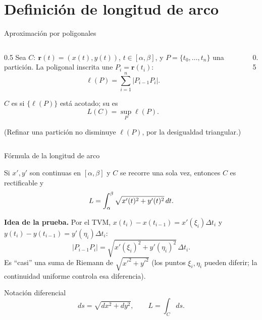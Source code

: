 \documentclass[10pt,aspectratio=169]{beamer}
\begin{document}
\section{Definición de longitud de arco}

\begin{frame}{Aproximación por poligonales}
  \begin{columns}
    \begin{column}{0.5\textwidth}
      Sea $C:\ \mathbf r(t)=(x(t),y(t))$, $t\in[\alpha,\beta]$, y $P=\{t_0,\dots,t_n\}$ una partición. La poligonal
      inscrita une $P_i=\mathbf r(t_i)$:
      \[ \ell(P)=\sum_{i=1}^n|P_{i-1}P_i|. \]
      \begin{definicion}
        $C$ es  si $\{\ell(P)\}$ está acotado; su  es
        \[ L(C)=\sup_P\ell(P). \]
      \end{definicion}
      \small (Refinar una partición no disminuye $\ell(P)$, por la desigualdad triangular.)
    \end{column}
    \begin{column}{0.5\textwidth}
      \centering
    \end{column}
  \end{columns}
\end{frame}

\begin{frame}{Fórmula de la longitud de arco}
  \begin{teorema}
    Si $x',y'$ son continuas en $[\alpha,\beta]$ y $C$ se recorre una sola vez, entonces $C$ es rectificable y
    \[ L=\int_\alpha^\beta\sqrt{x'(t)^2+y'(t)^2}\,dt. \]
  \end{teorema}
  \textbf{Idea de la prueba.} Por el TVM, $x(t_i)-x(t_{i-1})=x'(\xi_i)\Delta t_i$ y $y(t_i)-y(t_{i-1})=y'(\eta_i)\Delta t_i$:
  \[ |P_{i-1}P_i|=\sqrt{x'(\xi_i)^2+y'(\eta_i)^2}\,\Delta t_i. \]
  Es ``casi'' una suma de Riemann de $\sqrt{x'^2+y'^2}$ (los puntos $\xi_i,\eta_i$ pueden diferir; la continuidad
  uniforme controla esa diferencia).
  \begin{block}{Notación diferencial}
    \[ ds=\sqrt{dx^2+dy^2},\qquad L=\int_C ds. \]
  \end{block}
\end{frame}
\end{document}
